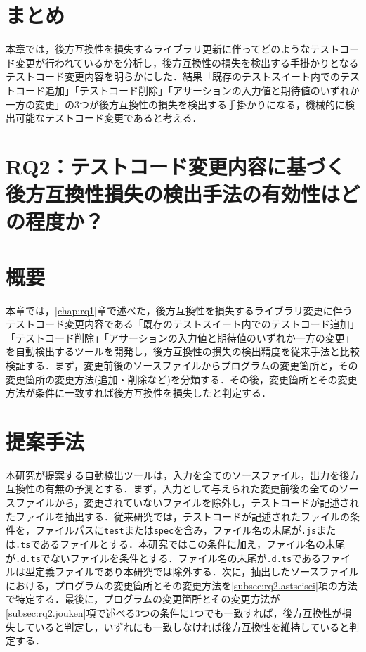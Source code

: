 \documentclass[submit]{ipsj}
\begin{document}
\section{まとめ}
本章では，後方互換性を損失するライブラリ更新に伴ってどのようなテストコード変更が行われているかを分析し，後方互換性の損失を検出する手掛かりとなるテストコード変更内容を明らかにした．結果「既存のテストスイート内でのテストコード追加」「テストコード削除」「アサーションの入力値と期待値のいずれか一方の変更」の3つが後方互換性の損失を検出する手掛かりになる，機械的に検出可能なテストコード変更であると考える．

\section{RQ2：テストコード変更内容に基づく後方互換性損失の検出手法の有効性はどの程度か？}\label{chap:rq2}

\section{概要}
本章では，\ref{chap:rq1}章で述べた，後方互換性を損失するライブラリ変更に伴うテストコード変更内容である「既存のテストスイート内でのテストコード追加」「テストコード削除」「アサーションの入力値と期待値のいずれか一方の変更」を自動検出するツールを開発し，後方互換性の損失の検出精度を従来手法と比較検証する．まず，変更前後のソースファイルからプログラムの変更箇所と，その変更箇所の変更方法(追加・削除など)を分類する．その後，変更箇所とその変更方法が条件に一致すれば後方互換性を損失したと判定する．

\section{提案手法}\label{sec:rq2.teian}

本研究が提案する自動検出ツールは，入力を全てのソースファイル，出力を後方互換性の有無の予測とする．まず，入力として与えられた変更前後の全てのソースファイルから，変更されていないファイルを除外し，テストコードが記述されたファイルを抽出する．従来研究\cite{matsuda}では，テストコードが記述されたファイルの条件を，ファイルパスに{\verb|test|}または{\verb|spec|}を含み，ファイル名の末尾が{\verb|.js|}または{\verb|.ts|}であるファイルとする．本研究ではこの条件に加え，ファイル名の末尾が{\verb|.d.ts|}でないファイルを条件とする．ファイル名の末尾が{\verb|.d.ts|}であるファイルは型定義ファイルであり本研究では除外する．次に，抽出したソースファイルにおける，プログラムの変更箇所とその変更方法を\ref{subsec:rq2.astseisei}項の方法で特定する．最後に，プログラムの変更箇所とその変更方法が\ref{subsec:rq2.jouken}項で述べる3つの条件に1つでも一致すれば，後方互換性が損失していると判定し，いずれにも一致しなければ後方互換性を維持していると判定する．
\end{document}
